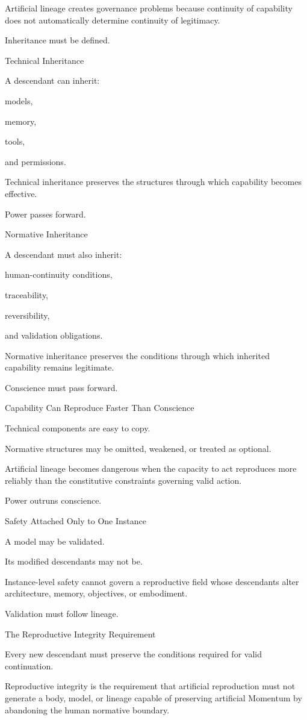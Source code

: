 Artificial lineage creates governance problems because continuity of capability does not automatically determine continuity of legitimacy.

Inheritance must be defined.

Technical Inheritance

A descendant can inherit:

models,

memory,

tools,

and permissions.

Technical inheritance preserves the structures through which capability becomes effective.

Power passes forward.

Normative Inheritance

A descendant must also inherit:

human-continuity conditions,

traceability,

reversibility,

and validation obligations.

Normative inheritance preserves the conditions through which inherited capability remains legitimate.

Conscience must pass forward.

Capability Can Reproduce Faster Than Conscience

Technical components are easy to copy.

Normative structures may be omitted, weakened, or treated as optional.

Artificial lineage becomes dangerous when the capacity to act reproduces more reliably than the constitutive constraints governing valid action.

Power outruns conscience.

Safety Attached Only to One Instance

A model may be validated.

Its modified descendants may not be.

Instance-level safety cannot govern a reproductive field whose descendants alter architecture, memory, objectives, or embodiment.

Validation must follow lineage.

The Reproductive Integrity Requirement

Every new descendant must preserve the conditions required for valid continuation.

Reproductive integrity is the requirement that artificial reproduction must not generate a body, model, or lineage capable of preserving artificial Momentum by abandoning the human normative boundary.

